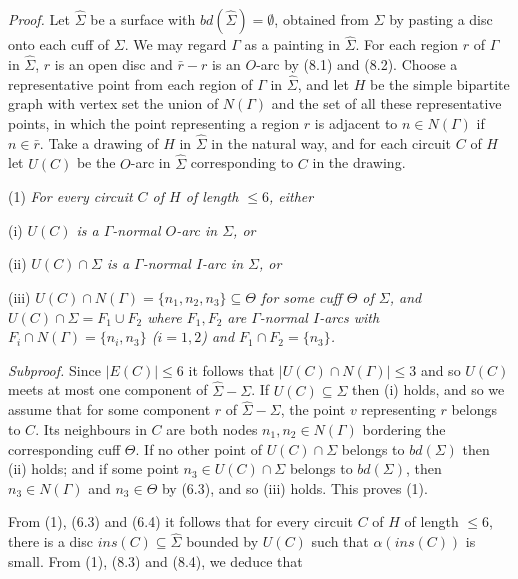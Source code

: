 \textit{Proof.} Let $\hat{\Sigma}$ be a surface with $bd(\hat{\Sigma}) = \emptyset$, obtained from $\Sigma$ by pasting a disc onto each cuff of $\Sigma$. We may regard $\Gamma$ as a painting in $\hat{\Sigma}$. For each region $r$ of $\Gamma$ in $\hat{\Sigma}$, $r$ is an open disc and $\bar{r} - r$ is an $O$-arc by (8.1) and (8.2). Choose a representative point from each region of $\Gamma$ in $\hat{\Sigma}$, and let $H$ be the simple bipartite graph with vertex set the union of $N(\Gamma)$ and the set of all these representative points, in which the point representing a region $r$ is adjacent to $n \in N(\Gamma)$ if $n \in \bar{r}$. Take a drawing of $H$ in $\hat{\Sigma}$ in the natural way, and for each circuit $C$ of $H$ let $U(C)$ be the $O$-arc in $\hat{\Sigma}$ corresponding to $C$ in the drawing.

\hspace*{12pt}(1) \textit{For every circuit $C$ of $H$ of length $\le 6$, either}

\hspace*{12pt}(i) \textit{$U(C)$ is a $\Gamma$-normal $O$-arc in $\Sigma$, or}

\hspace*{12pt}(ii) \textit{$U(C) \cap \Sigma$ is a $\Gamma$-normal $I$-arc in $\Sigma$, or}

\hspace*{12pt}(iii) \textit{$U(C) \cap N(\Gamma) = \{n_1, n_2, n_3\} \subseteq \Theta$ for some cuff $\Theta$ of $\Sigma$, and $U(C) \cap \Sigma = F_1 \cup F_2$ where $F_1, F_2$ are $\Gamma$-normal $I$-arcs with $F_i \cap N(\Gamma) = \{n_i, n_3\}$ ($i = 1, 2$) and $F_1 \cap F_2 = \{n_3\}$.}

\textit{Subproof.} Since $|E(C)| \le 6$ it follows that $|U(C) \cap N(\Gamma)| \le 3$ and so $U(C)$ meets at most one component of $\hat{\Sigma} - \Sigma$. If $U(C) \subseteq \Sigma$ then (i) holds, and so we assume that for some component $r$ of $\hat{\Sigma} - \Sigma$, the point $v$ representing $r$ belongs to $C$. Its neighbours in $C$ are both nodes $n_1, n_2 \in N(\Gamma)$ bordering the corresponding cuff $\Theta$. If no other point of $U(C) \cap \Sigma$ belongs to $bd(\Sigma)$ then (ii) holds; and if some point $n_3 \in U(C) \cap \Sigma$ belongs to $bd(\Sigma)$, then $n_3 \in N(\Gamma)$ and $n_3 \in \Theta$ by (6.3), and so (iii) holds. This proves (1).

From (1), (6.3) and (6.4) it follows that for every circuit $C$ of $H$ of length $\le 6$, there is a disc $ins(C) \subseteq \hat{\Sigma}$ bounded by $U(C)$ such that $\alpha(ins(C))$ is small. From (1), (8.3) and (8.4), we deduce that

